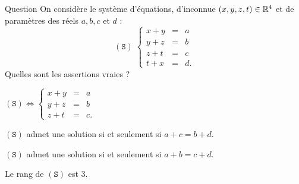 \begin{multi}[multiple,feedback=
{\[(\mathtt{S}) \Leftrightarrow  
\left\{\begin{array}{rcc}
x+y&=&a\\
y+z&=&b\\ 
z+t&=&c\\ 
0&=&b+d-a-c.\end{array}\right.\]
On en déduit que si \(a+c\neq b+d\), \((\mathtt{S})\) n'admet pas de solution et que si \(a+c= b+d\), 
\((\mathtt{S})\) en admet une infinité.
}]{Question}
On considère le système d'équations, d'inconnue \((x,y,z,t)\in \mathbb{R}^4\) et de paramètres des réels 
\(a,b,c\) et \(d\) :
\[(\mathtt{S}) \; \left\{\begin{array}{rcc}
x+y&=&a\\
y+z&=&b\\ 
z+t&=&c\\
t+x&=&d.\end{array}\right.\]
Quelles sont les assertions vraies ?

    \item \((\mathtt{S}) \Leftrightarrow
\left\{\begin{array}{rcc}
x+y&=&a\\
y+z&=&b\\
z+t&=&c.\end{array}\right.\)
    \item* \((\mathtt{S})\) admet une  solution si et seulement si \(a+c=b+d\).
    \item \((\mathtt{S})\) admet une  solution si et seulement si \(a+b=c+d\).
    \item* Le rang de \((\mathtt{S})\) est \(3\).
\end{multi}


